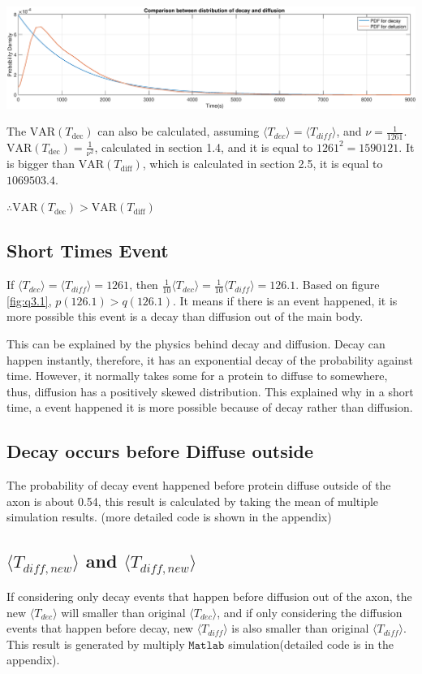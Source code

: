 \includegraphics[width=\linewidth]{img/figure3.eps}
\label{fig:q3.1}

The $\text{VAR}(T_{\text{dec}})$ can also be 
calculated, 
assuming $\langle T_{dec} \rangle =  \langle T_{diff} \rangle$, 
and $\nu = \frac{1}{1261}$. 
$\text{VAR}(T_{\text{dec}}) = \frac{1}{\nu^2}$, 
calculated in section 1.4, 
and it is equal to $1261^2 = 1590121$. 
It is bigger than $\text{VAR}(T_{\text{diff}}) $, 
which is calculated in section 2.5, 
it is equal to $1069503.4$.

$\therefore \text{VAR}(T_{\text{dec}}) > \text{VAR}(T_{\text{diff}})$


\subsection{Short Times Event}

If $\langle T_{dec} \rangle =  \langle T_{diff} \rangle = 1261$, 
then $\frac{1}{10} \langle T_{dec} \rangle = \frac{1}{10} \langle T_{diff} \rangle = 126.1$. 
Based on figure \ref{fig:q3.1}, 
$p(126.1) > q(126.1)$. 
It means if there is an event happened, 
it is more possible this event is a decay 
than diffusion out of the main body.


This can be explained by the physics 
behind decay and diffusion.
Decay can happen instantly, 
therefore, it has an exponential decay 
of the probability against time. 
However, 
it normally takes some for a protein to diffuse 
to somewhere, 
thus, 
diffusion has a positively skewed distribution. 
This explained why in a short time, 
a event happened it is more possible 
because of decay rather than diffusion.

\subsection{Decay occurs before Diffuse outside}
The probability of 
decay event happened before 
protein diffuse outside of the axon 
is about 0.54, 
this result is calculated by taking the mean 
of multiple simulation results.
(more detailed code is shown in the appendix)

\subsection{$\langle T_{diff,new} \rangle$ and $\langle T_{diff,new} \rangle$}

If considering only decay events that happen before diffusion 
out of the axon, 
the new $\langle T_{dec} \rangle$ will smaller 
than original $\langle T_{dec} \rangle$,  
and if only considering 
the diffusion events that happen before decay, 
new $\langle T_{diff} \rangle$ is also smaller  
than original $\langle T_{diff} \rangle$. 
This result is generated by multiply 
$\mathtt{Matlab}$ simulation(detailed code is in the appendix).
\newpage